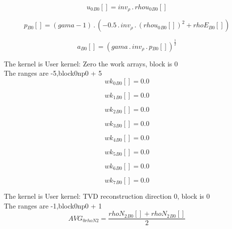 \documentclass{article}
\begin{document}
\begin{dmath}{u_{0}{_{B0}}}[{}] = inv_{\rho} \,.\, {rhou_{0}{_{B0}}}[{}]\end{dmath}

\begin{dmath}{p{_{B0}}}[{}] = \left(gama - 1\right) \,.\, \left(- 0.5 \,.\, inv_{\rho} \,.\, \left({rhou_{0}{_{B0}}}[{}] \right)^{2} + {rhoE{_{B0}}}[{}]\right)\end{dmath}

\begin{dmath}{a{_{B0}}}[{}] = \left(gama \,.\, inv_{\rho} \,.\, {p{_{B0}}}[{}] \right)^{\frac{1}{2}}\end{dmath}

\noindent The kernel is User kernel: Zero the work arrays, block is 0\\\noindent The ranges are -5,block0np0 + 5\\\begin{dmath}{wk_{0}{_{B0}}}[{}] = 0.0\end{dmath}

\begin{dmath}{wk_{1}{_{B0}}}[{}] = 0.0\end{dmath}

\begin{dmath}{wk_{2}{_{B0}}}[{}] = 0.0\end{dmath}

\begin{dmath}{wk_{3}{_{B0}}}[{}] = 0.0\end{dmath}

\begin{dmath}{wk_{4}{_{B0}}}[{}] = 0.0\end{dmath}

\begin{dmath}{wk_{5}{_{B0}}}[{}] = 0.0\end{dmath}

\begin{dmath}{wk_{6}{_{B0}}}[{}] = 0.0\end{dmath}

\begin{dmath}{wk_{7}{_{B0}}}[{}] = 0.0\end{dmath}

\noindent The kernel is User kernel: TVD reconstruction direction 0, block is 0\\\noindent The ranges are -1,block0np0 + 1\\\begin{dmath}AVG_{0 rhoN2} = \frac{{rhoN_{2}{_{B0}}}[{}] + {rhoN_{2}{_{B0}}}[{}]}{2}\end{dmath}
\end{document}
